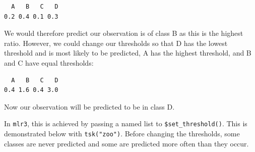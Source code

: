 \begin{verbatim}
  A   B   C   D 
0.2 0.4 0.1 0.3 
\end{verbatim}

We would therefore predict our observation is of class B as this is the
highest ratio. However, we could change our thresholds so that D has the
lowest threshold and is most likely to be predicted, A has the highest
threshold, and B and C have equal thresholds:

\begin{Shaded}
\begin{Highlighting}[]
\OtherTok{=} \NormalTok{(} \NormalTok{, } \NormalTok{, } \NormalTok{, } \NormalTok{)}
\SpecialCharTok{/}
\end{Highlighting}
\end{Shaded}

\begin{verbatim}
  A   B   C   D 
0.4 1.6 0.4 3.0 
\end{verbatim}

Now our observation will be predicted to be in class D.

In \texttt{mlr3}, this is achieved by passing a named list to
\texttt{\$set\_threshold()}. This is demonstrated below with
\texttt{tsk("zoo")}. Before changing the thresholds, some classes are
never predicted and some are predicted more often than they occur.

\begin{Shaded}
\begin{Highlighting}[]

\OtherTok{=} \NormalTok{(}\NormalTok{)}
\OtherTok{=} 
\OtherTok{=} \NormalTok{(}\NormalTok{, } \NormalTok{)}
\SpecialCharTok{$}\SpecialCharTok{$}
\OtherTok{=}\SpecialCharTok{$}\SpecialCharTok{$}
\OtherTok{=} \SpecialCharTok{+} \NormalTok{(}\NormalTok{)}
\OtherTok{=} \NormalTok{(}\SpecialCharTok{$}\SpecialCharTok{$}
\end{Highlighting}
\end{Shaded}

